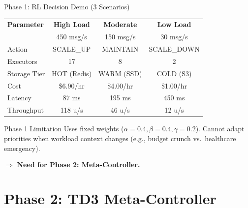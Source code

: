\documentclass{beamer}
\begin{document}
\begin{frame}{Phase 1: RL Decision Demo (3 Scenarios)}
\begin{table}[H]
\centering
\scriptsize
\begin{tabular}{|l|c|c|c|}
\hline
\textbf{Parameter} & \textbf{High Load} & \textbf{Moderate} & \textbf{Low Load} \\
 & 450 msg/s & 150 msg/s & 30 msg/s \\
\hline
Action & SCALE\_UP & MAINTAIN & SCALE\_DOWN \\
Executors & 17 & 8 & 2 \\
Storage Tier & HOT (Redis) & WARM (SSD) & COLD (S3) \\
Cost & \$6.90/hr & \$4.00/hr & \$1.00/hr \\
Latency & 87 ms & 195 ms & 450 ms \\
Throughput & 118 u/s & 46 u/s & 12 u/s \\
\hline
\end{tabular}
\end{table}
\vspace{0.2cm}
\begin{alertblock}{Phase 1 Limitation}
Uses fixed weights ($\alpha{=}0.4, \beta{=}0.4, \gamma{=}0.2$). Cannot adapt priorities when workload context changes (e.g., budget crunch vs.\ healthcare emergency).
\end{alertblock}
$\Rightarrow$ \textbf{Need for Phase 2: Meta-Controller.}
\end{frame}

\section{Phase 2: TD3 Meta-Controller}
\end{document}

